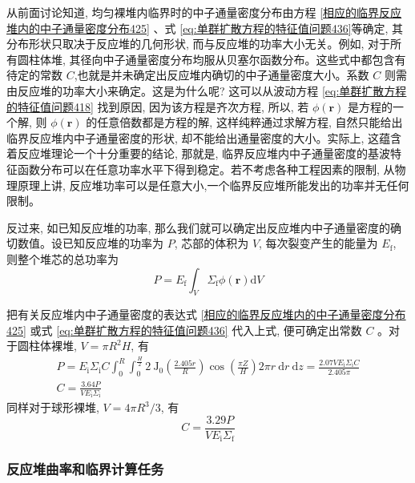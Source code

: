 \documentclass{Sichuan Normal University}
\begin{document}
    
    从前面讨论知道, 均匀裸堆内临界时的中子通量密度分布由方程 \eqref{相应的临界反应堆内的中子通量密度分布425} 、式 \eqref{eq:单群扩散方程的特征值问题436}等确定, 其分布形状只取决于反应堆的几何形状, 而与反应堆的功率大小无关。例如, 对于所有圆柱体堆, 其径向中子通量密度分布均服从贝塞尔函数分布。这些式中都包含有待定的常数 $C$,也就是并未确定出反应堆内确切的中子通量密度大小。系数 $C$ 则需由反应堆的功率大小来确定。这是为什么呢? 这可以从波动方程 \eqref{eq:单群扩散方程的特征值问题418} 找到原因, 因为该方程是齐次方程, 所以, 若 $\phi(\boldsymbol{r})$ 是方程的一个解, 则 $\phi(\boldsymbol{r})$ 的任意倍数都是方程的解, 这样纯粹通过求解方程, 自然只能给出临界反应堆内中子通量密度的形状, 却不能给出通量密度的大小。实际上, 这蕴含着反应堆理论一个十分重要的结论, 那就是, 临界反应堆内中子通量密度的基波特征函数分布可以在任意功率水平下得到稳定。若不考虑各种工程因素的限制, 从物理原理上讲, 反应堆功率可以是任意大小,一个临界反应堆所能发出的功率并无任何限制。
    
    反过来, 如已知反应堆的功率, 那么我们就可以确定出反应堆内中子通量密度的确切数值。设已知反应堆的功率为 $P$, 芯部的体积为 $V$, 每次裂变产生的能量为 $E_{\mathrm{f}}$, 则整个堆芯的总功率为
    \begin{equation}
    P=E_{\mathrm{f}} \int_V \Sigma_{\mathrm{f}} \phi(\boldsymbol{r}) \mathrm{d} V
\end{equation}
    
    把有关反应堆内中子通量密度的表达式 \eqref{相应的临界反应堆内的中子通量密度分布425} 或式 \eqref{eq:单群扩散方程的特征值问题436} 代入上式, 便可确定出常数 $C$ 。对于圆柱体裸堆, $V=\pi R^2 H$, 有
    \begin{equation}
    \begin{gathered}
    P=E_{\mathrm{i}} \Sigma_{\mathrm{i}} C \int_0^R \int_0^{\frac{H}{2}} 2 \mathrm{~J}_0\left(\frac{2.405 r}{R}\right) \cos \left(\frac{\pi Z}{H}\right) 2 \pi r \mathrm{~d} r \mathrm{~d} z=\frac{2.07 V E_{\mathrm{i}} \Sigma_{\mathrm{i}} C}{2.405 \pi} \\
    C=\frac{3.64 P}{V E_{\mathrm{i}} \Sigma_{\mathrm{i}}}
    \end{gathered}
\end{equation}
    同样对于球形裸堆, $V=4 \pi R^3 / 3$, 有
    \begin{equation}
    C=\frac{3.29 P}{V E_{\mathrm{i}} \Sigma_{\mathrm{f}}}
\end{equation}
\subsubsection*{反应堆曲率和临界计算任务}
    
\end{document}
